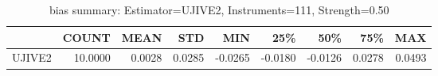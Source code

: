 \begin{table}[ht]
\centering
\caption{bias summary: Estimator=UJIVE2, Instruments=111, Strength=0.50}
\begin{tabular}{lrrrrrrrr}
\toprule
 & COUNT & MEAN & STD & MIN & 25\% & 50\% & 75\% & MAX \\
\midrule
UJIVE2 & 10.0000 & 0.0028 & 0.0285 & -0.0265 & -0.0180 & -0.0126 & 0.0278 & 0.0493 \\
\bottomrule
\end{tabular}
\end{table}
